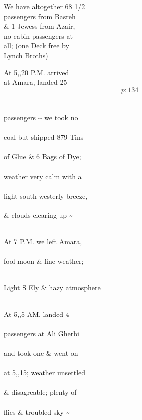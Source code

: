 \documentclass{report}
\begin{document}
	\par{
 	We have altogether 68 1/2\ \\passengers from Basreh\ \\\& 1 Jewess from Azair,\ \\no cabin passengers at\ \\all; (one Deck free by\ \\Lynch Broths)\ \\
	}

	\par{
 	At 5,,20 P.M. arrived\ \\at Amara, landed 25\ \\
  \[p: 134 \]
\ \\\ \\passengers \~{} we took no\ \\\ \\coal but shipped 879 Tins\ \\\ \\of Glue \& 6 Bags of Dye;\ \\\ \\weather very calm with a\ \\\ \\light south westerly breeze,\ \\\ \\\& clouds clearing up \~{}\ \\\ \\
	}

	\par{
 	At 7 P.M. we left Amara,\ \\\ \\fool moon \& fine weather;\ \\\ \\
	}

	\par{
 	Light S Ely \& hazy atmosphere\ \\\ \\
	}

	\par{
 	At 5,,5 AM. landed 4\ \\\ \\passengers at Ali Gherbi\ \\\ \\and took one \& went on\ \\\ \\at 5,,15; weather unsettled\ \\\ \\\& disagreable; plenty of\ \\\ \\flies \& troubled sky \~{}\ \\\ \\
	}
\end{document}
